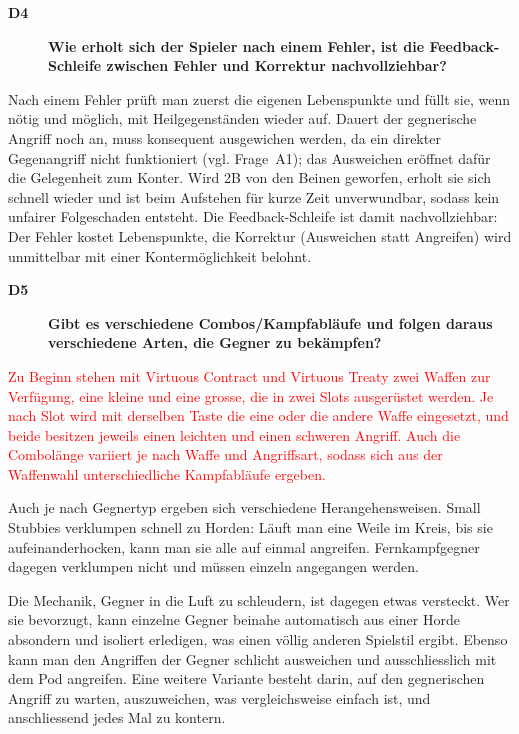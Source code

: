 \documentclass[../Main.tex]{subfiles}
\begin{document}
\begin{description}
    \item[\textbf{D4}] \textbf{Wie erholt sich der Spieler nach einem Fehler, ist die Feedback-Schleife zwischen Fehler und Korrektur nachvollziehbar?}
\end{description}

Nach einem Fehler prüft man zuerst die eigenen Lebenspunkte und füllt sie, wenn nötig und möglich, mit Heilgegenständen wieder auf. Dauert der gegnerische Angriff noch an, muss konsequent ausgewichen werden, da ein direkter Gegenangriff nicht funktioniert (vgl. Frage~A1); das Ausweichen eröffnet dafür die Gelegenheit zum Konter. Wird 2B von den Beinen geworfen, erholt sie sich schnell wieder und ist beim Aufstehen für kurze Zeit unverwundbar, sodass kein unfairer Folgeschaden entsteht. Die Feedback-Schleife ist damit nachvollziehbar: Der Fehler kostet Lebenspunkte, die Korrektur (Ausweichen statt Angreifen) wird unmittelbar mit einer Kontermöglichkeit belohnt.

\begin{description}
    \item[\textbf{D5}] \textbf{Gibt es verschiedene Combos/Kampfabläufe und folgen daraus verschiedene Arten, die Gegner zu bekämpfen?}
\end{description}

\textcolor{red}{Zu Beginn stehen mit Virtuous Contract und Virtuous Treaty zwei Waffen zur Verfügung, eine kleine und eine grosse, die in zwei Slots ausgerüstet werden. Je nach Slot wird mit derselben Taste die eine oder die andere Waffe eingesetzt, und beide besitzen jeweils einen leichten und einen schweren Angriff. Auch die Combolänge variiert je nach Waffe und Angriffsart, sodass sich aus der Waffenwahl unterschiedliche Kampfabläufe ergeben.}

Auch je nach Gegnertyp ergeben sich verschiedene Herangehensweisen. Small Stubbies verklumpen schnell zu Horden: Läuft man eine Weile im Kreis, bis sie aufeinanderhocken, kann man sie alle auf einmal angreifen. Fernkampfgegner dagegen verklumpen nicht und müssen einzeln angegangen werden.

\begingroup\color{red}Die Mechanik, Gegner in die Luft zu schleudern, ist dagegen etwas versteckt. Wer sie bevorzugt, kann einzelne Gegner beinahe automatisch aus einer Horde absondern und isoliert erledigen, was einen völlig anderen Spielstil ergibt. Ebenso kann man den Angriffen der Gegner schlicht ausweichen und ausschliesslich mit dem Pod angreifen. Eine weitere Variante besteht darin, auf den gegnerischen Angriff zu warten, auszuweichen, was vergleichsweise einfach ist, und anschliessend jedes Mal zu kontern.
\end{document}
